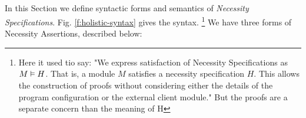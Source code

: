 




\subsection{\Chainmail} %
\label{s:holistic-guarantees}

In this Section we define syntactic forms and semantics of
\emph{Necessity Specifications}. Fig. \ref{f:holistic-syntax} 
gives the syntax.
\footnote{
Here it used tio say: "We express satisfaction of Necessity Specifications as $M \vDash H$.
That is, a module $M$ satisfies a necessity specification $H$. This allows 
the construction of proofs without considering either the details 
of the program configuration or the external client module." But the proofs are
a separate concern than the meaning of H}
We have three forms of Necessity Assertions, described below:

